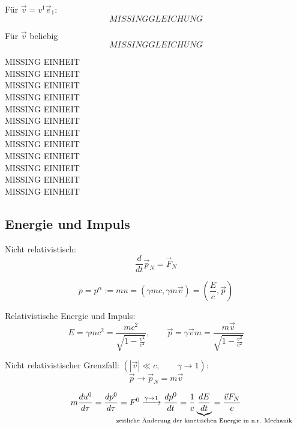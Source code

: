 \documentclass[a4paper, 11pt]{article}
\numberwithin{equation}{section}
\newcommand{\ubtext}[2]{\underbrace{#1}_{\mathclap{\text{#2}}}}
\begin{document}
Für $\vec{v}= v^1\vec{e}_1$:
\begin{equation}
MISSING GLEICHUNG
\end{equation}

Für $\vec{v}$ beliebig
\begin{equation}
MISSING GLEICHUNG
\end{equation}

\newpage
MISSING EINHEIT \\
MISSING EINHEIT \\
MISSING EINHEIT \\
MISSING EINHEIT \\
MISSING EINHEIT \\
MISSING EINHEIT \\
MISSING EINHEIT \\
MISSING EINHEIT \\
MISSING EINHEIT \\
MISSING EINHEIT \\
MISSING EINHEIT \\
MISSING EINHEIT
\subsection*{Energie und Impuls}
Nicht relativistisch:
\begin{equation*}
\dfrac{d}{dt} \vec{p}_N = \vec{F}_N
\end{equation*}

\begin{equation}
p = p^\alpha := mu = \left( \gamma mc, \gamma m \vec{v} \right) = \left( \dfrac{E}{c}, \vec{p} \right)
\end{equation}

Relativistische Energie und Impuls:
\begin{equation}
E = \gamma m c^2 = \dfrac{mc^2}{\sqrt{1- \frac{v^2}{c^2}}} , \qquad \vec{p} = \gamma \vec{v} m = \dfrac{m \vec{v}}{\sqrt{1-\frac{v^2}{c^2}}}
\end{equation}

Nicht relativistischer Grenzfall: $\left( | \vec{v} | \ll c, \qquad \gamma \rightarrow 1 \right)$:
\begin{equation*}
\vec{p} \rightarrow \vec{p}_N = m \vec{v}
\end{equation*}

\begin{equation}
m \dfrac{du^0}{d\tau} = \dfrac{dp^0}{d\tau} = F^0 \xrightarrow{\gamma \rightarrow 1} \dfrac{dp^0}{dt} = \dfrac{1}{c} \ubtext{\dfrac{dE}{dt}}{zeitliche Änderung der kinetischen Energie in n.r. Mechanik} = \dfrac{\vec{v} F_N}{c}
\end{equation}
\end{document}
